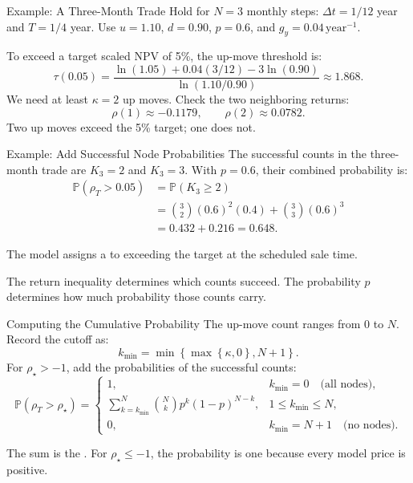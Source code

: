 \documentclass[aspectratio=169,11pt]{beamer}
\newcommand{\Pmeasure}{\mathbb{P}}
\begin{document}
\begin{frame}{Example: A Three-Month Trade}
Hold for $N=3$ monthly steps: $\Delta t=1/12$ year and $T=1/4$ year.
  Use $u=1.10$, $d=0.90$, $p=0.6$, and $g_y=0.04\,\mathrm{year}^{-1}$.

  \vspace{0.5em}
  To exceed a target scaled NPV of 5\%, the up-move threshold is:
  \[
    \tau(0.05)
    =\frac{\ln(1.05)+0.04(3/12)-3\ln(0.90)}{\ln(1.10/0.90)}
    \approx1.868.
  \]
  We need at least $\kappa=2$ up moves. Check the two neighboring returns:
  \[
    \rho(1)\approx-0.1179,\qquad \rho(2)\approx0.0782.
  \]
  Two up moves exceed the 5\% target; one does not.
\end{frame}

\begin{frame}{Example: Add Successful Node Probabilities}
The successful counts in the three-month trade are $K_3=2$ and $K_3=3$.
  With $p=0.6$, their combined probability is:
  \[
    \begin{aligned}
      \Pmeasure(\rho_T>0.05)
      &=\Pmeasure(K_3\ge2)\\[0.3em]
      &=\binom32(0.6)^2(0.4)+\binom33(0.6)^3\\[0.3em]
      &=0.432+0.216=0.648.
    \end{aligned}
  \]

  The model assigns a  to exceeding the target
  at the scheduled sale time.

  \vspace{0.5em}
  The return inequality determines which counts succeed.
  The probability $p$ determines how much probability those counts carry.
\end{frame}

\begin{frame}{Computing the Cumulative Probability}
The up-move count ranges from $0$ to $N$. Record the cutoff as:
  \[
    k_{\min}=\min\!\left\{\max\!\left\{\kappa,0\right\},N+1\right\}.
  \]
  For $\rho_\star>-1$, add the probabilities of the successful counts:
  \[
    \Pmeasure(\rho_T>\rho_\star)=
    \begin{cases}
      1, & k_{\min}=0\quad\text{(all nodes)},\\[0.35em]
      \displaystyle\sum_{k=k_{\min}}^N\binom Nk p^k(1-p)^{N-k},
        & 1\le k_{\min}\le N,\\[0.35em]
      0, & k_{\min}=N+1\quad\text{(no nodes)}.
    \end{cases}
  \]

  The sum is the . For $\rho_\star\le-1$,
  the probability is one because every model price is positive.
\end{frame}
\end{document}
